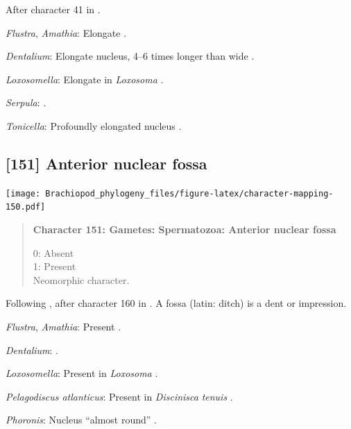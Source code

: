\documentclass[openany]{book}
\begin{document}
After character 41 in \citet{Ponder1997}.

\hypertarget{Amathia-coding-150}{}
\emph{Flustra}, \emph{Amathia}: Elongate \citep{Franzen1981}.

\hypertarget{Dentalium-coding-150}{}
\emph{Dentalium}: Elongate nucleus, 4--6 times longer than wide
\citep{DufresneDube1983}.

\hypertarget{Loxosomella-coding-150}{}
\emph{Loxosomella}: Elongate in \emph{Loxosoma} \citep{Franzen2000}.

\hypertarget{Serpula-coding-150}{}
\emph{Serpula}: \citet{Gherardi2011}.

\hypertarget{Tonicella-coding-150}{}
\emph{Tonicella}: Profoundly elongated nucleus
\citep{BucklandNicks1988}.

\subsection*{{[}151{]} Anterior nuclear
fossa}\label{anterior-nuclear-fossa}

\texttt{[image: Brachiopod\_phylogeny\_files/figure-latex/character-mapping-150.pdf]}

\begin{quote}
\textbf{Character 151: Gametes: Spermatozoa: Anterior nuclear fossa}

0: Absent\\
1: Present\\
Neomorphic character.
\end{quote}

Following \citet{Smith2012}, after character 160 in \citet{Giribet2002}.
A fossa (latin: ditch) is a dent or impression.

\hypertarget{Amathia-coding-151}{}
\emph{Flustra}, \emph{Amathia}: Present \citep[in
\emph{Tubulipora};][]{Franzen1984}.

\hypertarget{Dentalium-coding-151}{}
\emph{Dentalium}: \citet{DufresneDube1983}.

\hypertarget{Loxosomella-coding-151}{}
\emph{Loxosomella}: Present in \emph{Loxosoma} \citep{Franzen2000}.

\hypertarget{Pelagodiscus_atlanticus-coding-151}{}
\emph{Pelagodiscus atlanticus}: Present in \emph{Discinisca}
\emph{tenuis} \citep{Hodgson1994Ultrastructureof}.

\hypertarget{Phoronis-coding-151}{}
\emph{Phoronis}: Nucleus ``almost round''
\citep{Reunov2004Ultrastructuralstudy}.
\end{document}
